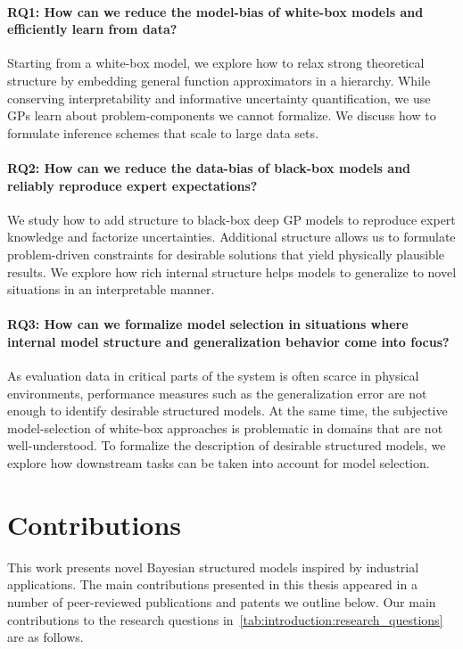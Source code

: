 \paragraph{RQ1: How can we reduce the model-bias of white-box models and efficiently learn from data?}
Starting from a white-box model, we explore how to relax strong theoretical structure by embedding general function approximators in a hierarchy.
While conserving interpretability and informative uncertainty quantification, we use GPs learn about problem-components we cannot formalize.
We discuss how to formulate inference schemes that scale to large data sets.

\paragraph{RQ2: How can we reduce the data-bias of black-box models and reliably reproduce expert expectations?}
We study how to add structure to black-box deep GP models to reproduce expert knowledge and factorize uncertainties.
Additional structure allows us to formulate problem-driven constraints for desirable solutions that yield physically plausible results.
We explore how rich internal structure helps models to generalize to novel situations in an interpretable manner.

\paragraph{RQ3: How can we formalize model selection in situations where internal model structure and generalization behavior come into focus?}
As evaluation data in critical parts of the system is often scarce in physical environments, performance measures such as the generalization error are not enough to identify desirable structured models.
At the same time, the subjective model-selection of white-box approaches is problematic in domains that are not well-understood.
To formalize the description of desirable structured models, we explore how downstream tasks can be taken into account for model selection.

\section{Contributions}
This work presents novel Bayesian structured models inspired by industrial applications.
The main contributions presented in this thesis appeared in a number of peer-reviewed publications and patents we outline below.
Our main contributions to the research questions in~\cref{tab:introduction:research_questions} are as follows.


